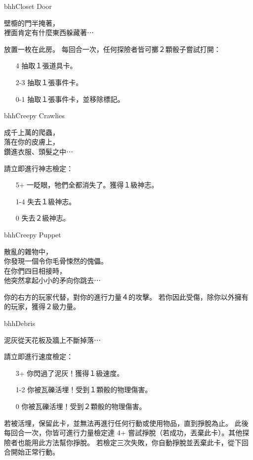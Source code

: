 \linebreak[0]%
\begin{EventCard}{bhh}{Closet Door}
  \begin{CardStory}
    壁櫥的門半掩著，\\
    裡面肯定有什麼東西躲藏著⋯
  \end{CardStory}
  放置一枚在此房。\smallbreak
  每回合一次，任何探險者皆可擲２顆骰子嘗試打開：
  \begin{itemize}
    \item[4] 抽取１張道具卡。
    \item[2-3] 抽取１張事件卡。
    \item[0-1] 抽取１張事件卡，並移除標記。
  \end{itemize}
\end{EventCard}%
\linebreak[0]%
\begin{EventCard}{bhh}{Creepy Crawlies}
  \begin{CardStory}
    成千上萬的爬蟲，\\
    落在你的皮膚上，\\
    鑽進衣服、頭髮之中⋯
  \end{CardStory}
  請立即進行神志檢定：
  \begin{itemize}
    \item[5+] 一眨眼，牠們全都消失了。獲得１級神志。
    \item[1-4] 失去１級神志。
    \item[0] 失去２級神志。
  \end{itemize}
\end{EventCard}%
\linebreak[0]%
\begin{EventCard}{bhh}{Creepy Puppet}
  \begin{CardStory}
    散亂的雜物中，\\
    你發現一個令你毛骨悚然的傀儡。\\
    在你們四目相接時，\\
    他突然拿起小小的矛向你跳去⋯
  \end{CardStory}
  你的右方的玩家代替\ThisName{}，對你的進行力量４的攻擊。\smallbreak
  若你因此受傷，除你以外擁有的玩家，獲得２級力量。\smallbreak
\end{EventCard}%
\linebreak[0]%
\begin{EventCard}{bhh}{Debris}
  \begin{CardStory}
    泥灰從天花板及牆上不斷掉落⋯
  \end{CardStory}
  \footnotesize
  請立即進行速度檢定：
  \begin{itemize}
    \item[3+] 你閃過了泥灰！獲得１級速度。
    \item[1-2] 你被瓦礫活埋！受到１顆骰的物理傷害。
    \item[0] 你被瓦礫活埋！受到２顆骰的物理傷害。
  \end{itemize}
  若被活埋，保留此卡，並無法再進行任何行動或使用物品，直到掙脫為止。\smallbreak
  此後每回合一次，你皆可進行力量檢定達 4+ 嘗試掙脫（若成功，丟棄此卡）。其他探險者也能用此方法幫你掙脫。\smallbreak
  若檢定三次失敗，你自動掙脫並丟棄此卡，從下回合開始正常行動。\smallbreak
\end{EventCard}%
